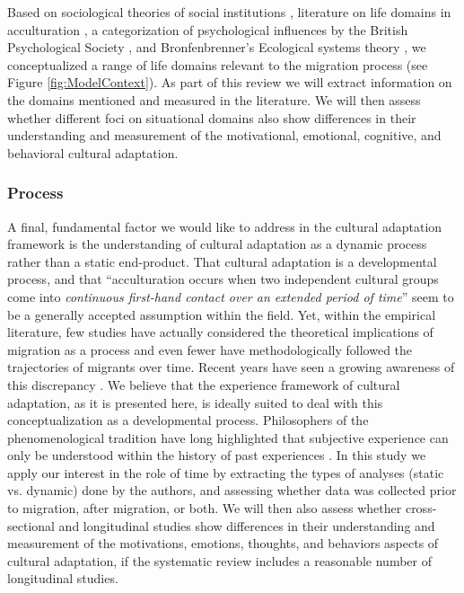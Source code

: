 \documentclass[man, 12pt, a4paper]{apa7}
\begin{document}
Based on sociological theories of social institutions \citep{Durkheim1982}, literature on life domains in acculturation \citep{Arends-Toth2006a, Arends-Toth2007, Zane2004}, a categorization of psychological influences by the British Psychological Society \citep{Michie2005a}, and Bronfenbrenner's Ecological systems theory \citep{Bronfenbrenner1992}, we conceptualized a range of life domains relevant to the migration process (see Figure \ref{fig:ModelContext}). As part of this review we will extract information on the domains mentioned and measured in the literature. We will then assess whether different foci on situational domains also show differences in their understanding and measurement of the motivational, emotional, cognitive, and behavioral cultural adaptation.

\subsubsection{Process} 
A final, fundamental factor we would like to address in the cultural adaptation framework is the understanding of cultural adaptation as a dynamic process rather than a static end-product. That cultural adaptation is a developmental process, and that ``acculturation occurs when two independent cultural groups come into \textit{continuous first-hand contact over an extended period of time}'' \citep[][186]{Berry1989} seem to be a generally accepted assumption within the field. Yet, within the empirical literature, few studies have actually considered the theoretical implications of migration as a process and even fewer have methodologically followed the trajectories of migrants over time. Recent years have seen a growing awareness of this discrepancy \citep[e.g.,][]{Brown2011, Ward2019}. We believe that the experience framework of cultural adaptation, as it is presented here, is ideally suited to deal with this conceptualization as a developmental process. Philosophers of the phenomenological tradition have long highlighted that subjective experience can only be understood within the history of past experiences \citep[e.g.,][; also see Figure \ref{fig:ModelContext}]{Heidegger1867}. In this study we apply our interest in the role of time by extracting the types of analyses (static vs. dynamic) done by the authors, and assessing whether data was collected prior to migration, after migration, or both. We will then also assess whether cross-sectional and longitudinal studies show differences in their understanding and measurement of the motivations, emotions, thoughts, and behaviors aspects of cultural adaptation, if the systematic review includes a reasonable number of longitudinal studies.
\end{document}
